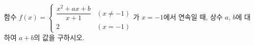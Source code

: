 함수 $f(x)=\begin{cases} \dfrac{x^2+ax+b}{x+1} & (x\ne -1) \\ 2 & (x=-1) \end{cases}$가 $x=-1$에서 연속일 때, 상수 $a$, $b$에 대하여 $a+b$의 값을 구하시오.
